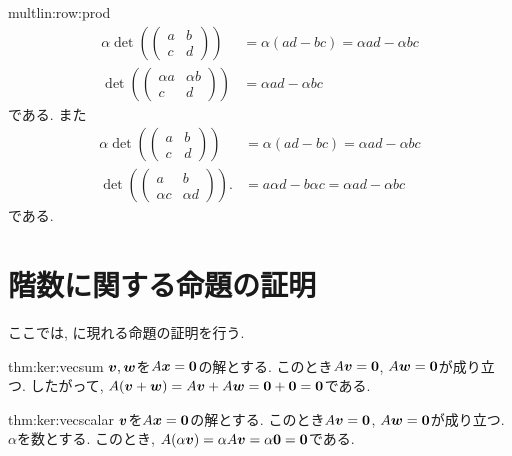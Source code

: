 \begin{proofof}{multlin:row:prod}
  \begin{align*}
    \alpha\det(\begin{pmatrix}a&b\\c&d\end{pmatrix})
      &=\alpha(ad-bc)=\alpha ad-\alpha bc\\
      \det(\begin{pmatrix}\alpha  a&\alpha b\\c&d\end{pmatrix})
        &=\alpha a d-\alpha bc
  \end{align*}
  である.
  また
  \begin{align*}
    \alpha\det(\begin{pmatrix}a&b\\c&d\end{pmatrix})
      &=\alpha(ad-bc)=\alpha ad-\alpha bc\\
      \det(\begin{pmatrix}a&b\\\alpha   c&\alpha  d\end{pmatrix}).
        &=a\alpha d-b\alpha c=\alpha ad-\alpha bc
  \end{align*}
  である.
\end{proofof}

\section{階数に関する命題の証明}
ここでは, に現れる命題の証明を行う.


\begin{proofof*}{thm:ker:vec}{sum}
  $\boldsymbol{v},\boldsymbol{w}$を$A\boldsymbol{x}=\boldsymbol{0}$の解とする.
  このとき$A\boldsymbol{v}=\boldsymbol{0}$, $A\boldsymbol{w}=\boldsymbol{0}$が成り立つ.
  したがって,
  $A(\boldsymbol{v}+\boldsymbol{w})=A\boldsymbol{v}+A\boldsymbol{w}=\boldsymbol{0}+\boldsymbol{0}=\boldsymbol{0}$である.
\end{proofof*}

\begin{proofof*}{thm:ker:vec}{scalar}
  $\boldsymbol{v}$を$A\boldsymbol{x}=\boldsymbol{0}$の解とする.
  このとき$A\boldsymbol{v}=\boldsymbol{0}$, $A\boldsymbol{w}=\boldsymbol{0}$が成り立つ.
  $\alpha$を数とする.
  このとき,
  $A(\alpha\boldsymbol{v})=\alpha A\boldsymbol{v}=\alpha\boldsymbol{0}=\boldsymbol{0}$である.
\end{proofof*}

